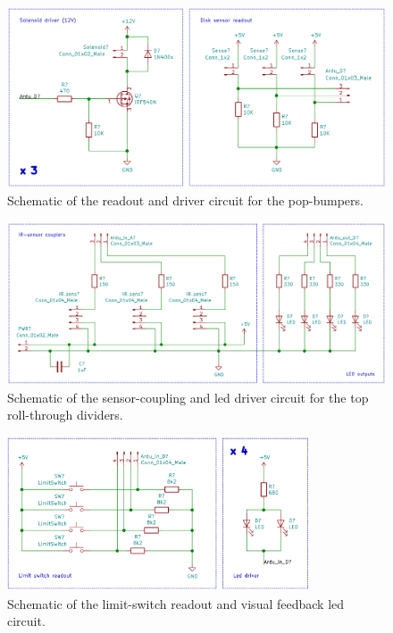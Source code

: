 \begin{figure}[h]
	\centering
	\includegraphics[width=\textwidth]{circuits/popbumper}
	\caption{Schematic of the readout and driver circuit for the pop-bumpers.}
	\label{cir:bumper}
\end{figure}

\begin{figure}[h]
	\centering
	\includegraphics[width=\textwidth]{circuits/toprollers}
	\caption{Schematic of the sensor-coupling and led driver circuit for the top roll-through dividers.}
	\label{cir:top}
\end{figure}

\begin{figure}[h]
	\centering
	\includegraphics[width=0.8\textwidth]{circuits/limitswitch}
	\caption{Schematic of the limit-switch readout and visual feedback led circuit.}
	\label{cir:switches}
\end{figure}

